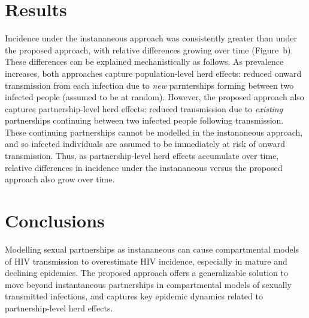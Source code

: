 \section{Results}
Incidence under the instananeous approach was
consistently greater than under the proposed approach,
with relative differences growing over time (Figure~b).
These differences can be explained mechanistically as follows.
As prevalence increases, both approaches capture population-level herd effects:
reduced onward transmission from each infection due to
\emph{new} parnterships forming between two infected people (assumed to be at random).
However, the proposed approach also captures partnership-level herd effects:
reduced transmission due to \emph{existing} partnerships
continuing between two infected people following transmission.
These continuing partnerships cannot be modelled in the instananeous approach,
and so infected individuals are assumed to be immediately at risk of onward transmission.
Thus, as partnership-level herd effects accumulate over time,
relative differences in incidence under the instananeous versus the proposed approach
also grow over time.  %
\section{Conclusions}
Modelling sexual partnerships as instananeous can cause  %
compartmental models of HIV transmission to overestimate HIV incidence,
especially in mature and declining epidemics.
The proposed approach offers a generalizable solution to move beyond instantaneous partnerships
in compartmental models of sexually transmitted infections,
and captures key epidemic dynamics related to partnership-level herd effects.  %

